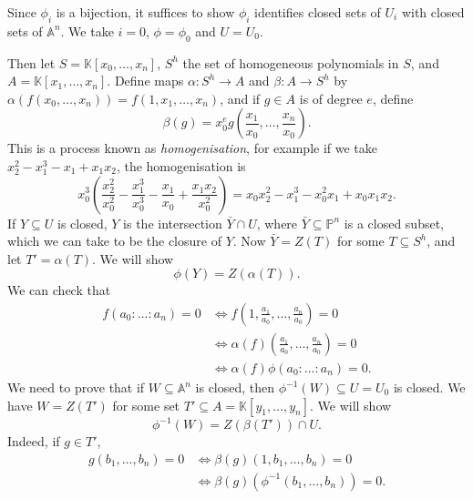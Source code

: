 \documentclass[12pt]{article}
\begin{document}
\begin{proofbox}
	Since $\phi_i$ is a bijection, it suffices to show $\phi_i$ identifies closed sets of $U_i$ with closed sets of $\mathbb{A}^n$. We take $i = 0$, $\phi = \phi_0$ and $U = U_0$.

	Then let $S = \mathbb{K}[x_0, \ldots, x_n]$, $S^h$ the set of homogeneous polynomials in $S$, and $A = \mathbb{K}[x_1, \ldots, x_n]$. Define maps $\alpha : S^h \to A$ and $\beta : A \to S^h$ by $\alpha(f(x_0, \ldots, x_n)) = f(1, x_1, \ldots, x_n)$, and if $g \in A$ is of degree $e$, define
	\[
	\beta(g) = x_0^e g \left( \frac{x_1}{x_0}, \ldots, \frac{x_n}{x_0} \right).
	\]
	This is a process known as \emph{homogenisation}, for example if we take $x_2^2 - x_1^3 - x_1 + x_1x_2$, the homogenisation is
	\[
	x_0^3 \left( \frac{x_2^2}{x_0^2} - \frac{x_1^3}{x_0^3} - \frac{x_1}{x_0} + \frac{x_1x_2}{x_0^2}\right) = x_0x_2^2 - x_1^3 - x_0^2x_1 + x_0x_1x_2.
	\]
	If $Y \subseteq U$ is closed, $Y$ is the intersection $\bar Y \cap U$, where $\bar Y \subseteq \mathbb{P}^n$ is a closed subset, which we can take to be the closure of $Y$. Now $\bar Y = Z(T)$ for some $T \subseteq S^h$, and let $T' = \alpha(T)$. We will show
	\[
	\phi(Y) = Z(\alpha(T)).
	\]
	We can check that
	\begin{align*}
		f(a_0 : \ldots : a_n) = 0 &\iff f\left( 1, \frac{a_1}{a_0}, \ldots, \frac{a_n}{a_0}\right) = 0 \\
					  &\iff \alpha(f) \left( \frac{a_1}{a_0}, \ldots, \frac{a_n}{a_0} \right) = 0  \\
					  &\iff \alpha(f) \phi(a_0 : \ldots : a_n) = 0.
	\end{align*}
	We need to prove that if $W \subseteq \mathbb{A}^n$ is closed, then $\phi^{-1}(W) \subseteq U = U_0$ is closed. We have $W = Z(T')$ for some set $T' \subseteq A = \mathbb{K}[y_1, \ldots, y_n]$. We will show
	\[
	\phi^{-1}(W) = Z(\beta(T')) \cap U.
	\]
	Indeed, if $g \in T'$,
	\begin{align*}
		g(b_1, \ldots, b_n) = 0 &\iff \beta(g)(1, b_1, \ldots, b_n) = 0 \\
					&\iff \beta(g)(\phi^{-1}(b_1, \ldots, b_n)) = 0.
	\end{align*}
\end{proofbox}
\end{document}
